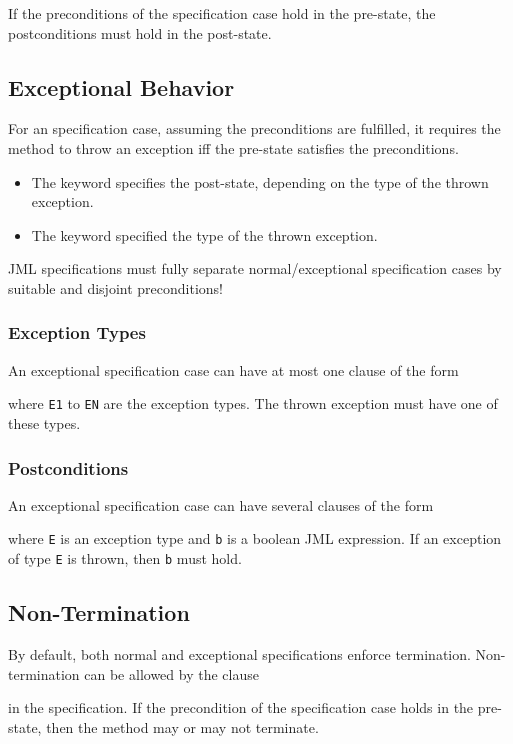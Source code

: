 				If the preconditions of the specification case hold in the pre-state, the postconditions must hold in the post-state.

		\subsection{Exceptional Behavior}
			For an  specification case, assuming the preconditions are fulfilled, it requires the method to throw an exception iff the pre-state satisfies the preconditions.
			\begin{itemize}
				\item The keyword  specifies the post-state, depending on the type of the thrown exception.
				\item The keyword  specified the type of the thrown exception.
			\end{itemize}
			JML specifications must fully separate normal/exceptional specification cases by suitable and disjoint preconditions!

			\subsubsection{Exception Types}
				An exceptional specification case can have at most one clause of the form
				\begin{center}
				\end{center}
				where \texttt{E1} to \texttt{EN} are the exception types. The thrown exception must have one of these types.

			\subsubsection{Postconditions}
				\label{sec:postcond2}
			
				An exceptional specification case can have several clauses of the form
				\begin{center}
				\end{center}
				where \texttt{E} is an exception type and \texttt{b} is a boolean JML expression. If an exception of type \texttt{E} is thrown, then \texttt{b} must hold.

		\subsection{Non-Termination}
			By default, both normal and exceptional specifications enforce termination. Non-termination can be allowed by the clause
			\begin{center}
			\end{center}
			in the specification. If the precondition of the specification case holds in the pre-state, then the method may or may not terminate.

